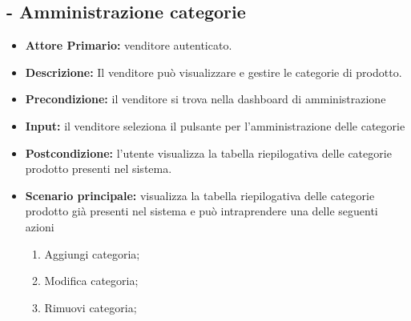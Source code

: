 \subsection{ - Amministrazione categorie}
\begin{itemize}
    \item \textbf{Attore Primario:}  venditore autenticato.
    \item \textbf{Descrizione:}  Il venditore può visualizzare e gestire le categorie di prodotto.
    \item \textbf{Precondizione:}  il venditore si trova nella dashboard di amministrazione
    \item \textbf{Input:} il venditore seleziona il pulsante per l'amministrazione delle categorie
    \item \textbf{Postcondizione:} l’utente visualizza la tabella riepilogativa delle categorie prodotto presenti nel sistema.
    \item \textbf{Scenario principale:} visualizza la tabella riepilogativa delle categorie prodotto già presenti nel sistema e può intraprendere una delle seguenti azioni
    \begin{enumerate}
        \item Aggiungi categoria;
        \item Modifica categoria;
        \item Rimuovi categoria;
    \end{enumerate}
\end{itemize}

\stepsubUserCase
